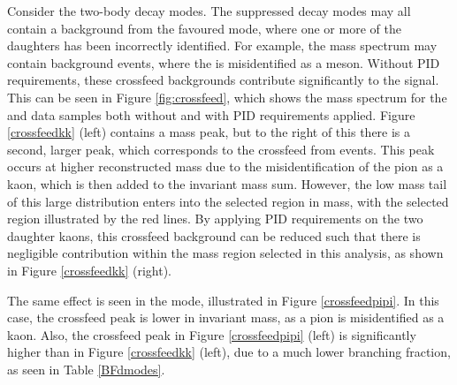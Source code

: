 Consider the two-body \Dz decay modes. The suppressed \Dz decay modes may all contain a background from the favoured \kpi mode, where one or more of the \Dz daughters has been incorrectly identified. For example, the \kk mass spectrum may contain background \kpi events, where the \pim is misidentified as a \Km meson. Without PID requirements, these crossfeed backgrounds contribute significantly to the signal. This can be seen in Figure \ref{fig:crossfeed}, which shows the \Dz mass spectrum for the \kk and \pipi data samples both without and with PID requirements applied. Figure \ref{crossfeedkk} (left) contains a \Dz mass peak, but to the right of this there is a second, larger peak, which corresponds to the crossfeed from \kpi events. This peak occurs at higher reconstructed \Dz mass due to the misidentification of the pion as a kaon, which is then added to the invariant mass sum. However, the low mass tail of this large distribution enters into the selected region in \Dz mass, with the selected region illustrated by the red lines. By applying PID requirements on the two \Dz daughter kaons, this crossfeed background can be reduced such that there is negligible contribution within the \Dz mass region selected in this analysis, as shown in Figure \ref{crossfeedkk} (right). 

The same effect is seen in the \pipi mode, illustrated in Figure \ref{crossfeedpipi}. In this case, the crossfeed peak is lower in invariant mass, as a pion is misidentified as a kaon. Also, the crossfeed peak in Figure \ref{crossfeedpipi} (left) is significantly higher than in Figure \ref{crossfeedkk} (left), due to a much lower \decay{\Dz}{\pip\pim} branching fraction, as seen in Table \ref{BFdmodes}.

